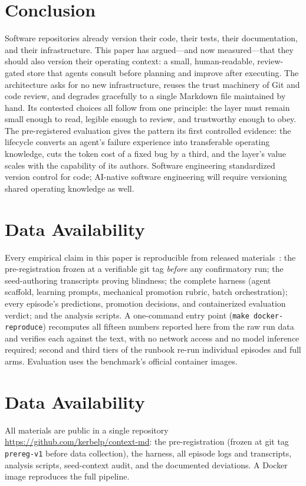 \documentclass[sigconf,nonacm]{acmart}
\newcommand{\artifact}{\url{https://github.com/kerbelp/context-md}}
\begin{document}
\section{Conclusion}
Software repositories already version their code, their tests, their documentation, and their infrastructure. This paper has argued---and now measured---that they should also version their operating context: a small, human-readable, review-gated store that agents consult before planning and improve after executing. The architecture asks for no new infrastructure, reuses the trust machinery of Git and code review, and degrades gracefully to a single Markdown file maintained by hand. Its contested choices all follow from one principle: the layer must remain small enough to read, legible enough to review, and trustworthy enough to obey. The pre-registered evaluation gives the pattern its first controlled evidence: the lifecycle converts an agent's failure experience into transferable operating knowledge, cuts the token cost of a fixed bug by a third, and the layer's value scales with the capability of its authors. Software engineering standardized version control for code; AI-native software engineering will require versioning shared operating knowledge as well.

\section*{Data Availability}
Every empirical claim in this paper is reproducible from released materials~\cite{artifact}: the pre-registration frozen at a verifiable git tag \emph{before} any confirmatory run; the seed-authoring transcripts proving blindness; the complete harness (agent scaffold, learning prompts, mechanical promotion rubric, batch orchestration); every episode's predictions, promotion decisions, and containerized evaluation verdict; and the analysis scripts. A one-command entry point (\texttt{make docker-reproduce}) recomputes all fifteen numbers reported here from the raw run data and verifies each against the text, with no network access and no model inference required; second and third tiers of the runbook re-run individual episodes and full arms. Evaluation uses the benchmark's official container images.

\section*{Data Availability}
All materials are public in a single repository \artifact{}: the pre-registration
(frozen at git tag \texttt{prereg-v1} before data collection), the harness, all
episode logs and transcripts, analysis scripts, seed-context audit, and the
documented deviations. A Docker image reproduces the full pipeline.
\end{document}
